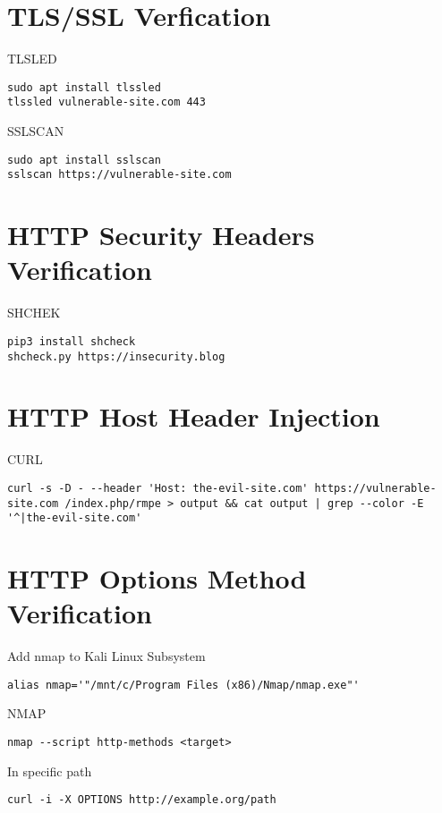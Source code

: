 \section{TLS/SSL Verfication}

TLSLED
\begin{lstlisting}[numbers=none]
sudo apt install tlssled
tlssled vulnerable-site.com 443
\end{lstlisting}

SSLSCAN
\begin{lstlisting}[numbers=none]
sudo apt install sslscan
sslscan https://vulnerable-site.com 
\end{lstlisting}

\section{HTTP Security Headers Verification}

SHCHEK
\begin{lstlisting}[numbers=none]
pip3 install shcheck
shcheck.py https://insecurity.blog
\end{lstlisting}

\section{HTTP Host Header Injection}

CURL
\begin{lstlisting}[numbers=none]
curl -s -D - --header 'Host: the-evil-site.com' https://vulnerable-site.com /index.php/rmpe > output && cat output | grep --color -E '^|the-evil-site.com' 
\end{lstlisting}


\section{HTTP Options Method Verification}

Add nmap to Kali Linux Subsystem
\begin{lstlisting}[numbers=none]
alias nmap='"/mnt/c/Program Files (x86)/Nmap/nmap.exe"'
\end{lstlisting}

NMAP
\begin{lstlisting}[numbers=none]
nmap --script http-methods <target>
\end{lstlisting}

In specific path
\begin{lstlisting}[numbers=none]
curl -i -X OPTIONS http://example.org/path
\end{lstlisting}

